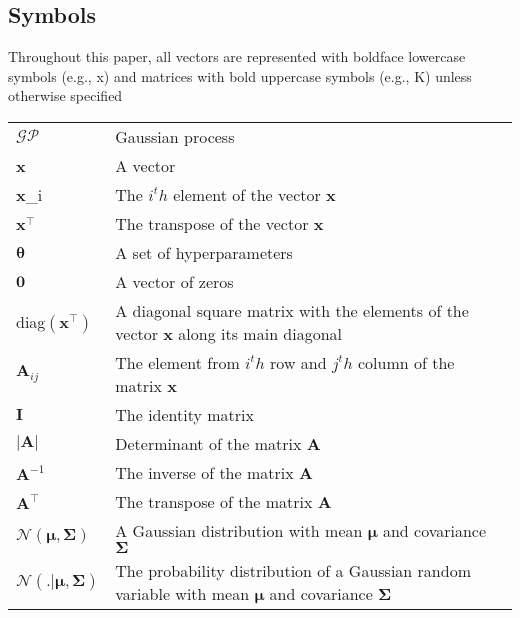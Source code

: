 \subsection{Symbols}
Throughout this paper, all vectors are represented with boldface lowercase symbols (e.g., x) and
matrices with bold uppercase symbols (e.g., K) unless otherwise specified %

\begin{table}[!htbp]
\renewcommand{\arraystretch}{1.3}
\begin{tabular}{l | l }
      $\mathcal{GP}$ & Gaussian process \\
      \textbf{x} & A vector \\
      \textbf{x}_i & The $i^th$ element of the vector \textbf{x} \\
      $\textbf{x}^\top$ & The transpose of the vector \textbf{x} \\
      $\boldsymbol{\theta}$ & A set of hyperparameters \\
      $\textbf{0}$ & A vector of zeros \\
      diag$\left(\textbf{x}^\top\right)$ & A diagonal square matrix with the elements of the vector \textbf{x} along its main diagonal \\
      $\textbf{A}_{ij}$ & The element from $i^th$ row and $j^th$ column of the matrix \textbf{x} \\
      $\textbf{I}$ & The identity matrix \\ 
      $|\textbf{A}|$ & Determinant of the matrix \textbf{A} \\
      $\textbf{A}^{-1}$ & The inverse of the matrix \textbf{A} \\
      $\textbf{A}^\top$ & The transpose of the matrix \textbf{A} \\     
      $\mathcal{N}\left(\boldsymbol{\mu},\boldsymbol{\Sigma}\right)$ & A Gaussian distribution with mean $\boldsymbol{\mu}$ and covariance $\boldsymbol{\Sigma}$ \\
      $\mathcal{N}\left(.|\boldsymbol{\mu},\boldsymbol{\Sigma}\right)$ & The probability distribution of a Gaussian random variable with mean $\boldsymbol{\mu}$ and covariance $\boldsymbol{\Sigma}$ \\         
  \end{tabular}
\end{table}